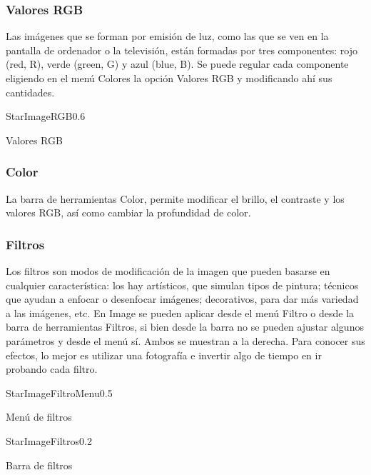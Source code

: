 
\subsubsection{Valores RGB}
Las imágenes que se forman por emisión de luz, como las que se ven en la pantalla de ordenador o la 
televisión, están formadas por tres componentes: rojo (red, R), verde (green, G) y azul (blue, B).
Se puede regular cada componente eligiendo en el menú Colores la opción Valores RGB y modificando ahí sus
cantidades.

\begin{figura}{StarImageRGB}{0.6}
\caption{Valores RGB}
\label{fig:StarImageRGB}
\end{figura}


\subsubsection{Color}
La barra de herramientas Color, permite modificar el brillo, el contraste y los valores RGB, así como 
cambiar la profundidad de color.

\subsubsection{Filtros}
Los filtros son modos de modificación de la imagen que pueden basarse en cualquier característica: 
los hay artísticos, que simulan tipos de pintura; técnicos que ayudan a enfocar o desenfocar imágenes; 
decorativos, para dar más variedad a las imágenes, etc. En Image se pueden aplicar desde el menú Filtro
o desde la barra de herramientas Filtros, si bien desde la barra no se pueden ajustar algunos parámetros
y desde el menú sí. Ambos se muestran a la derecha. Para conocer sus efectos, lo mejor es utilizar una 
fotografía e invertir algo de tiempo en ir probando cada filtro.

\begin{figura}{StarImageFiltroMenu}{0.5}
\caption{Menú de filtros}
\label{fig:StarImageFiltroMenu}
\end{figura}

\begin{figura}{StarImageFiltros}{0.2}
\caption{Barra de filtros}
\label{fig:StarImageFiltros}
\end{figura}



